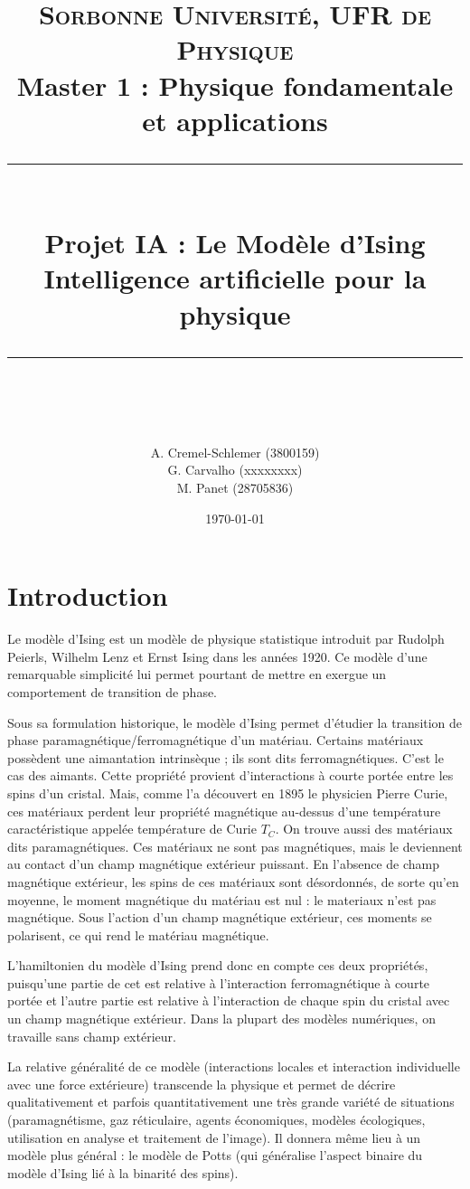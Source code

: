 \documentclass[11pt, parskip=half]{scrartcl} %
\title{	
	\normalfont\normalsize
	\large\textsc{Sorbonne Université, UFR de Physique}\\ %
	\vspace{2pt} %
	\normalsize Master 1 : Physique fondamentale et applications\\
	\vspace{25pt} %
	\rule{\linewidth}{0.5pt}\\ %
	\vspace{20pt} %
	{\huge Projet IA : Le Modèle d'Ising}\\ %
	\vspace{2pt} %
	{Intelligence artificielle pour la physique}\\
	\vspace{12pt} %
	\rule{\linewidth}{2pt}\\ %
	\vspace{12pt} %
}
\author{\LARGE A. Cremel-Schlemer \large (3800159) \\ \LARGE G. Carvalho \large (xxxxxxxx) \\ \LARGE M. Panet \large (28705836)} %
\date{\normalsize\today} %
\begin{document}
\maketitle %
\tableofcontents %

\newpage

\section*{Introduction}

Le modèle d'Ising est un modèle de physique statistique introduit par Rudolph Peierls, Wilhelm Lenz et Ernst Ising dans les années 1920. Ce modèle d'une remarquable simplicité lui permet pourtant de mettre en exergue un comportement de transition de phase. \par


Sous sa formulation historique, le modèle d'Ising permet d'étudier la transition de phase paramagnétique/ferromagnétique d'un matériau. 
Certains matériaux possèdent une aimantation intrinsèque ; ils sont dits ferromagnétiques. C'est le cas des aimants. Cette propriété provient d'interactions à courte portée entre les spins d'un cristal. Mais, comme l'a découvert en 1895 le physicien Pierre Curie, ces matériaux perdent leur propriété magnétique au-dessus d'une température caractéristique appelée température de Curie $T_C$.
On trouve aussi des matériaux dits paramagnétiques. Ces matériaux ne sont pas magnétiques, mais le deviennent au contact d'un champ magnétique extérieur puissant.
En l'absence de champ magnétique extérieur, les spins de ces matériaux sont désordonnés, de sorte qu'en moyenne, le moment magnétique du matériau est nul : le materiaux n'est pas magnétique. Sous l'action d'un champ magnétique extérieur, ces moments se polarisent, ce qui rend le matériau magnétique.

L'hamiltonien du modèle d'Ising prend donc en compte ces deux propriétés, puisqu'une partie de cet est relative à l'interaction ferromagnétique à courte portée et l'autre partie est relative à l'interaction de chaque spin du cristal avec un champ magnétique extérieur. 
Dans la plupart des modèles numériques, on travaille sans champ extérieur.


La relative généralité de ce modèle (interactions locales et interaction individuelle avec une force extérieure) transcende la physique et permet de décrire qualitativement et parfois quantitativement une très grande variété de situations (paramagnétisme, gaz réticulaire, agents économiques, modèles écologiques, utilisation en analyse et traitement de l'image). Il donnera même lieu à un modèle plus général : le modèle de Potts (qui généralise l'aspect binaire du modèle d'Ising lié à la binarité des spins).
\end{document}
